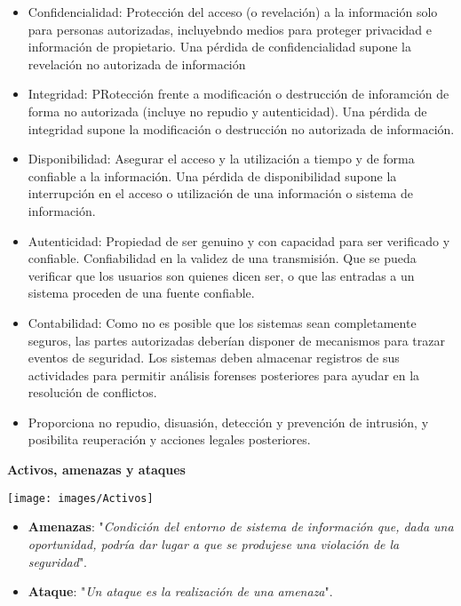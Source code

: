 \documentclass[10pt,portrait, twocolumn]{article}
\begin{document}
	\begin{itemize}
		\item Confidencialidad: Protección del acceso (o revelación) a la información solo para personas autorizadas, incluyebndo medios para proteger privacidad e información de propietario. Una pérdida de confidencialidad supone la revelación no autorizada de información
		\item Integridad: PRotección frente a modificación o destrucción de inforamción de forma no autorizada (incluye no repudio y autenticidad). Una pérdida de integridad supone la modificación o destrucción no autorizada de información.
		\item Disponibilidad: Asegurar el acceso y la utilización a tiempo y de forma confiable a la información. Una pérdida de disponibilidad supone la interrupción en el acceso o utilización de una información o sistema de información.
		\item Autenticidad: Propiedad de ser genuino y con capacidad para ser verificado y confiable. Confiabilidad en la validez de una transmisión. Que se pueda verificar que los usuarios son quienes dicen ser, o que las entradas a un sistema proceden de una fuente confiable.
		\item Contabilidad: Como no es posible que los sistemas sean completamente seguros, las partes autorizadas deberían disponer de mecanismos para trazar eventos de seguridad. Los sistemas deben almacenar registros de sus actividades para permitir análisis forenses posteriores para ayudar en la resolución de conflictos.
		\item Proporciona no repudio, disuasión, detección y prevención de intrusión, y posibilita reuperación y acciones legales posteriores.
	\end{itemize}
	
\textbf{Activos, amenazas y ataques}

\begin{center}
	\texttt{[image: images/Activos]}
\end{center}	

	\begin{itemize}
		\item \textbf{Amenazas}: "\textit{Condición del entorno de sistema de información que, dada una oportunidad, podría dar lugar a que se produjese una violación de la seguridad}".
		\item \textbf{Ataque}: "\textit{Un ataque es la realización de una amenaza}".
	\end{itemize}
	
\end{document}
